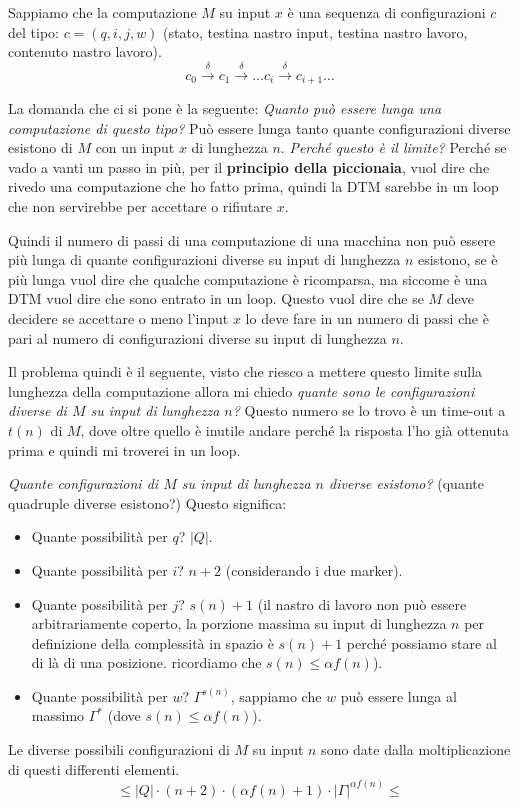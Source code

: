 \documentclass{article}
\begin{document}
Sappiamo che la computazione $M$ su input $x$ è una sequenza di configurazioni $c$ del tipo: $c=(q,i,j,w)$ (stato,
testina nastro input, testina nastro lavoro, contenuto nastro lavoro).
$$c_0\overset{\delta}{\rightarrow}c_1\overset{\delta}{\rightarrow}\dots c_i\overset{\delta}{\rightarrow}c_{i+1}\dots$$

La domanda che
ci si pone è la seguente: \textit{Quanto può essere lunga una computazione di questo tipo?}
Può essere lunga tanto quante configurazioni diverse esistono di $M$ con un input $x$ di lunghezza $n$.
\textit{Perché questo è il limite?} Perché se vado a vanti un passo in più, per il \textbf{principio
    della piccionaia}, vuol dire che rivedo una computazione che ho fatto prima, quindi la DTM sarebbe
in un loop che non servirebbe per accettare o rifiutare $x$.

Quindi il numero di passi di una computazione di una macchina non può essere più lunga di quante
configurazioni diverse su input di lunghezza $n$ esistono, se è più lunga vuol dire che qualche
computazione è ricomparsa, ma siccome è una DTM vuol dire che sono entrato in un loop. Questo
vuol dire che se $M$ deve decidere se accettare o meno l'input $x$ lo deve fare in un numero di passi
che è pari al numero di configurazioni diverse su input di lunghezza $n$.

Il problema quindi è il seguente, visto che riesco a mettere questo limite sulla lunghezza della computazione
allora mi chiedo \textit{quante sono le configurazioni diverse di $M$ su input di lunghezza $n$?}
Questo numero se lo trovo è un time-out a $t(n)$ di $M$, dove oltre quello è inutile andare
perché la risposta l'ho già ottenuta prima e quindi mi troverei in un loop.

\textit{Quante configurazioni di $M$ su input di lunghezza $n$ diverse esistono?} (quante
quadruple diverse esistono?) Questo significa:
\begin{itemize}
    \item Quante possibilità per $q$? $|Q|$.
    \item Quante possibilità per $i$? $n+2$ (considerando i due marker).
    \item Quante possibilità per $j$? $s(n)+1$ (il nastro di lavoro non può
          essere arbitrariamente coperto, la porzione massima su input di lunghezza $n$
          per definizione della complessità in spazio è $s(n)+1$ perché possiamo stare
          al di là di una posizione. ricordiamo che $s(n)\leq\alpha f(n)$).
    \item Quante possibilità per $w$? $\Gamma^{s(n)}$, sappiamo che $w$ può essere
          lunga al massimo $\Gamma^*$ (dove $s(n)\leq\alpha f(n)$).
\end{itemize}
Le diverse possibili configurazioni di $M$ su input $n$ sono date dalla moltiplicazione di questi
differenti elementi.
$$\leq |Q|\cdot(n+2)\cdot(\alpha f(n)+1)\cdot|\Gamma|^{\alpha f(n)}\leq$$
\end{document}

